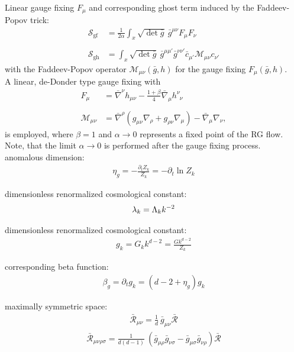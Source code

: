 Linear gauge fixing $F_{\mu}$ and corresponding ghost term induced by the Faddeev-Popov trick:
\begin{align}
\mathcal{S}_{\text{gf}} &= \frac{1}{2\alpha} \int_x \sqrt{\operatorname{det}\bar{g}} \  \bar{g}^{\mu\nu} F_{\mu}F_{\nu}	\nonumber\\
\phantom{.} \\
\mathcal{S}_{\text{gh}} &= \int_x \sqrt{\operatorname{det}\bar{g}} \  \bar{g}^{\mu\mu'} \bar{g}^{\nu\nu'}\bar{c}_{\mu'} \mathcal{M}_{\mu\nu}  c_{\nu'} \nonumber
\end{align}
with the Faddeev-Popov operator $\mathcal{M}_{\mu\nu}(\bar{g},h)$ for the gauge fixing $F_{\mu}(\bar{g},h)$. \\
A linear, de-Donder type gauge fixing with 
\begin{align}
	F_{\mu} &= \bar{\nabla}^{\nu}h_{\mu\nu} - \frac{1+\beta}{4}\bar{\nabla}_{\mu}h^{\nu}_{\phantom{\nu}\nu} \nonumber \\
	\phantom{.} \\
	\mathcal{M}_{\mu\nu} &= \bar{\nabla}^{\rho}(g_{\mu\nu}\nabla_{\rho} + g_{\rho\nu}\nabla_{\mu}) - \bar{\nabla}_{\mu}\nabla_{\nu}, \nonumber
\end{align}
is employed, where $\beta=1$ and $\alpha\rightarrow 0$ represents a fixed point of the RG flow. Note, that the limit  $\alpha\rightarrow 0$ is performed after the gauge fixing process.  \\

anomalous dimension: 
\begin{align*}
	\eta_g = -\frac{\partial_t Z_k}{Z_k} = -\partial_t \ln Z_k
\end{align*}

dimensionless renormalized cosmological constant:
\begin{align*}
	\lambda_k = \Lambda_k k^{-2}
\end{align*}

dimensionless renormalized cosmological constant:
\begin{align*}
	g_k = G_k k^{d-2} = \frac{Gk^{d-2}}{Z_k}
\end{align*}

corresponding beta function:
\begin{align}
	\beta_g = \partial_t g_k = \left(d-2 + \eta_g\right)g_k
\end{align}

maximally symmetric space:
\begin{align}
	\bar{\mathcal{R}}_{\mu\nu} = \frac{1}{d} \ \bar{g}_{\mu\nu} \bar{\mathcal{R}}
\end{align}
\begin{align}
	\bar{\mathcal{R}}_{\mu\nu\rho\sigma} = \frac{1}{d(d-1)} \ (\bar{g}_{\mu\rho}\bar{g}_{\nu\sigma} - \bar{g}_{\mu\sigma}\bar{g}_{\nu\rho}) \bar{\mathcal{R}}
\end{align}

